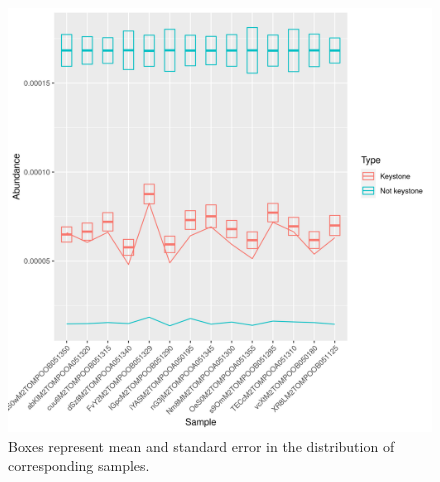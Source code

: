 \documentclass{article}
\begin{document}




\begin{figure}
 \centering
 \includegraphics[scale = 0.75]{mean_median_key_vs_not_key_tomate_desarrollo.csv.png}
\caption{Boxes represent mean and standard error in the distribution of corresponding samples.} %
\label{mean_median_tomate_desarrollo.csv}
\end{figure}
\end{document}
